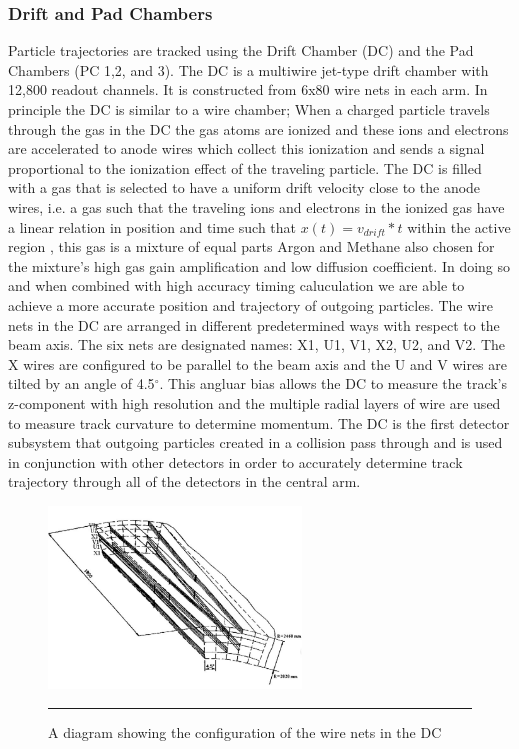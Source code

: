 \subsubsection{Drift and Pad Chambers}
Particle trajectories are tracked using the Drift Chamber (DC) and the Pad Chambers (PC 1,2, and 3). The DC is a multiwire jet-type drift chamber with 12,800 readout channels. It is constructed from 6x80 wire nets in each arm. In principle the DC is similar to a wire chamber; When a charged particle travels through the gas in the DC the gas atoms are ionized and these ions and electrons are accelerated to anode wires which collect this ionization and sends a signal proportional to the ionization effect of the traveling particle. The DC is filled with a gas that is selected to have a uniform drift velocity close to the anode wires, i.e. a gas such that the traveling ions and electrons in the ionized gas have a linear relation in position and time such that $x(t) = v_{drift} * t$ within the active region \citep{DCfocus}, this gas is a mixture of equal parts Argon and Methane also chosen for the mixture's high gas gain amplification and low diffusion coefficient. In doing so and when combined with high accuracy timing caluculation we are able to achieve a more accurate position and trajectory of outgoing particles. The wire nets in the DC are arranged in different predetermined ways with respect to the beam axis. The six nets are designated names: X1, U1, V1, X2, U2, and V2. The X wires are configured to be parallel to the beam axis and the U and V wires are tilted by an angle of 4.5$^\circ$. This angluar bias allows the DC to measure the track's z-component with high resolution and the multiple radial layers of wire are used to measure track curvature to determine momentum. The DC is the first detector subsystem that outgoing particles created in a collision pass through and is used in conjunction with other detectors in order to accurately determine track trajectory through all of the detectors in the central arm. 

\begin{figure}[htbp]
  \centering
    \includegraphics[width=0.6\textwidth]{Figures/dcdiagram.jpg}
    \rule{35em}{0.5pt}
  \caption[Wire net configuration in the DC]{A diagram showing the configuration of the wire nets in the DC}
  \label{fig:dcdiagram}
\end{figure}

